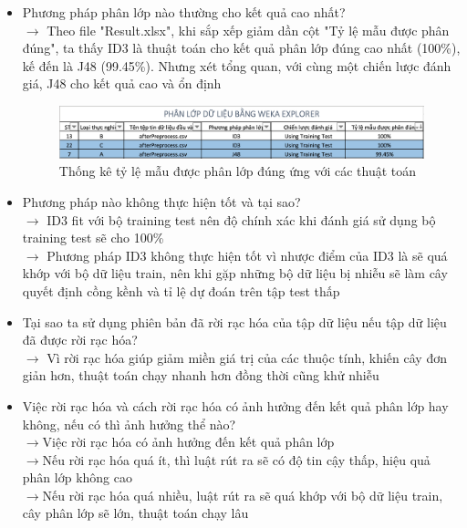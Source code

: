 \documentclass[a4paper, 12pt]{article}
\begin{document}
\begin{itemize}
    \item Phương pháp phân lớp nào thường cho kết quả cao nhất?\\
    $\rightarrow$ Theo file "Result.xlsx", khi sắp xếp giảm dần cột "Tỷ lệ mẫu được phân đúng", ta thấy ID3 là thuật toán cho kết quả phân lớp đúng cao nhất (100\%), kế đến là J48 (99.45\%). Nhưng xét tổng quan, với cùng một chiến lược đánh giá, J48 cho kết quả cao và ổn định
    \begin{figure}[H]
        \begin{center}
            \includegraphics[scale = 0.65]{./img/maxRate.png}
            \caption{Thống kê tỷ lệ mẫu được phân lớp đúng ứng với các thuật toán}
        \end{center}
    \end{figure}

    \item Phương pháp nào không thực hiện tốt và tại sao?\\
    $\rightarrow$ ID3 fit với bộ training test nên độ chính xác khi đánh giá sử dụng bộ training test sẽ cho 100\%\\
    $\rightarrow$ Phương pháp ID3 không thực hiện tốt vì nhược điểm của ID3 là sẽ quá khớp với bộ dữ liệu train, nên khi gặp những bộ dữ liệu bị nhiễu sẽ làm cây quyết định cồng kềnh và tỉ lệ dự đoán trên tập test thấp

    \item Tại sao ta sử dụng phiên bản đã rời rạc hóa của tập dữ liệu nếu tập dữ liệu đã được rời rạc hóa?\\
    $\rightarrow$ Vì rời rạc hóa giúp giảm miền giá trị của các thuộc tính, khiến cây đơn giản hơn, thuật toán chạy nhanh hơn đồng thời cũng khử nhiễu

    \item Việc rời rạc hóa và cách rời rạc hóa có ảnh hưởng đến kết quả phân lớp hay không, nếu có thì ảnh hưởng thể nào?\\
    $\rightarrow$Việc rời rạc hóa có ảnh hưởng đến kết quả phân lớp\\
    $\rightarrow$Nếu rời rạc hóa quá ít, thì luật rút ra sẽ có độ tin cậy thấp, hiệu quả phân lớp không cao\\
    $\rightarrow$Nếu rời rạc hóa quá nhiều, luật rút ra sẽ quá khớp với bộ dữ liệu train, cây phân lớp sẽ lớn, thuật toán chạy lâu


\end{itemize}
\end{document}

